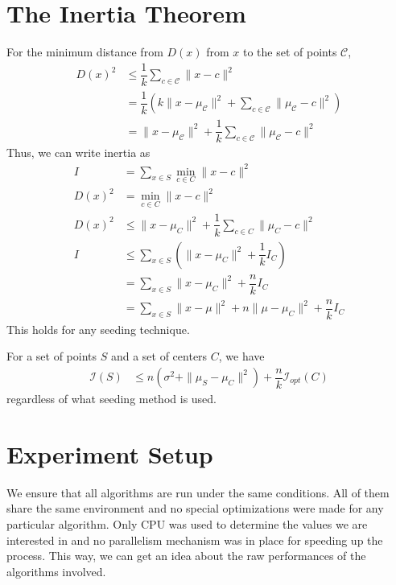 \documentclass[twoside, 11pt]{article}
\newcommand{\X}{\mathbf{X}}
\newcommand{\C}{\mathcal{C}}
\newcommand{\I}{\mathcal{I}}
\begin{document}
	\section{The Inertia Theorem}
	For the minimum distance from $D(x)$ from $x$ to the set of points $\C$,
		\begin{align*}
			D(x)^2 & \leq \dfrac{1}{k}\sum_{c\in \C}\|x-c\|^2\\
					& = \dfrac{1}{k}\left(k\|x-\mu_{\C}\|^2+\sum_{c\in\C}\|\mu_{\C}-c\|^2\right)\\
					& = \|x-\mu_{\C}\|^2+\dfrac{1}{k}\sum_{c\in\C}\|\mu_{\C}-c\|^2
		\end{align*}
	Thus, we can write inertia as 
		\begin{align*}
			I & = \sum_{x\in S}\min_{c\in C}\|x-c\|^2\\
			D(x)^2 & = \min_{c\in C}\|x-c\|^2\\
			D(x)^2 & \leq \|x-\mu_{C}\|^2+\dfrac{1}{k}\sum_{c\in C}\|\mu_{C}-c\|^2\\
			I & \leq \sum_{x\in S}\left(\|x-\mu_C\|^2+\dfrac1kI_C\right)\\
			& = \sum_{x\in S}\|x-\mu_C\|^2+\dfrac nkI_C\\
			& = \sum_{x\in S}\|x-\mu\|^2+n\|\mu-\mu_C\|^2+\dfrac nkI_C
		\end{align*}
	This holds for any seeding technique.
		\begin{theorem}
			For a set of points $S$ and a set of centers $C$, we have
				\begin{align*}
					\I(S) & \leq n(\sigma^2+\|\mu_S-\mu_C\|^2)+\dfrac{n}{k}\I_{opt}(C)
				\end{align*}
			regardless of what seeding method is used.
		\end{theorem}
	\section{Experiment Setup}
	We ensure that all algorithms are run under the same conditions. All of them share the same environment and no special optimizations were made for any particular algorithm. Only CPU was used to determine the values we are interested in and no parallelism mechanism was in place for speeding up the process. This way, we can get an idea about the raw performances of the algorithms involved.
	
\end{document}
